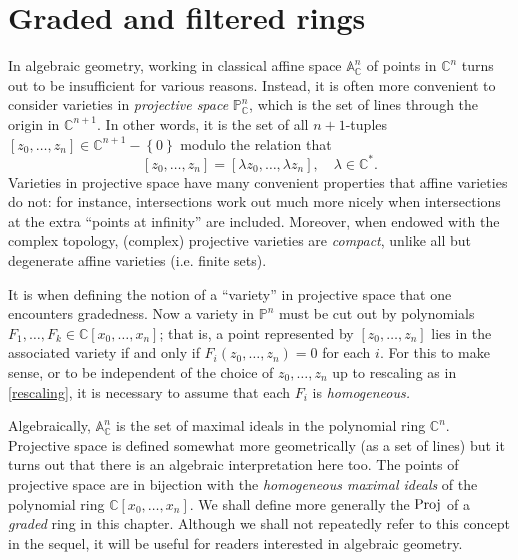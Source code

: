\chapter{Graded and filtered rings}

In algebraic geometry, working in classical affine space
$\mathbb{A}^n_{\mathbb{C}}$ of points in $\mathbb{C}^n$ turns out to be
insufficient for various reasons.
Instead, it is often more convenient to consider varieties in \emph{projective
space} $\mathbb{P}^n_{\mathbb{C}}$, which is the set of lines through the
origin in $\mathbb{C}^{n+1}$. 
In other words, it is the set of all $n+1$-tuples $[z_0, \dots, z_n] \in
\mathbb{C}^{n+1} - \left\{0\right\}$ modulo the relation that
\begin{equation} \label{rescaling} [z_0, \dots, z_n] = [\lambda z_0, \dots, \lambda z_n], \quad \lambda \in
\mathbb{C}^*.  \end{equation}
Varieties in projective space  have many
convenient properties that affine varieties do not: for instance,
intersections work out much more nicely when intersections at the extra
``points at infinity'' are included. 
Moreover, when endowed with the complex topology, (complex) projective
varieties are \emph{compact}, unlike all but degenerate affine varieties (i.e.
finite sets).

It is when defining the notion of a ``variety'' in projective space that one
encounters gradedness. Now a variety in $\mathbb{P}^n$ must be cut out by
polynomials $F_1, \dots, F_k \in \mathbb{C}[x_0, \dots, x_n]$; that is, a
point represented by $[z_0, \dots, z_n]$ lies in the associated variety if and
only if $F_i(z_0, \dots, z_n) = 0$ for each $i$. For this to make sense, or to
be independent of the choice of $z_0, \dots, z_n$ up to rescaling as in
\eqref{rescaling}, it is necessary to assume
that each $F_i$ is \emph{homogeneous.}

Algebraically, $\mathbb{A}^n_{\mathbb{C}}$ is the set of maximal ideals in the
polynomial ring $\mathbb{C}^{n}$. Projective space is defined somewhat more
geometrically (as a set of lines) but it turns out that there is an
algebraic interpretation here too. The points of projective space are in
bijection with the \emph{homogeneous maximal ideals} of the polynomial ring
$\mathbb{C}[x_0, \dots, x_n]$. We shall define  more generally the $\operatorname{Proj}$ of a
\emph{graded} ring in this chapter. Although we shall not repeatedly refer to
this concept in the sequel, it will be useful for readers interested in
algebraic geometry.

